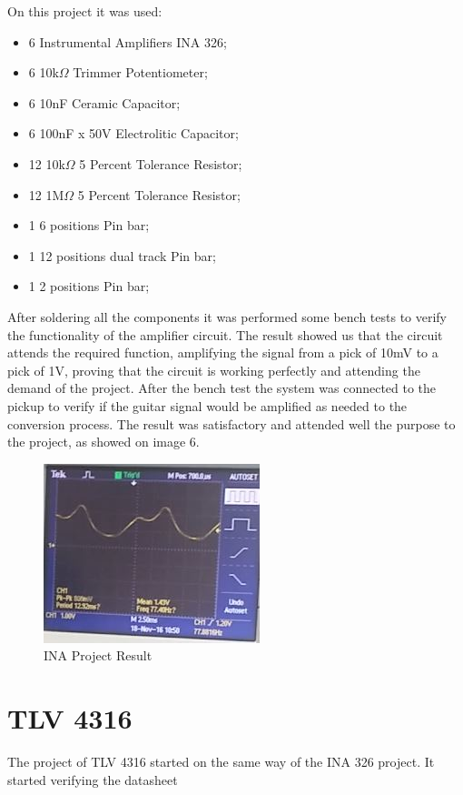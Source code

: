 On this project it was used:

\begin{itemize}
\item 6 Instrumental Amplifiers INA 326;
\item 6 10k$\Omega$ Trimmer Potentiometer;
\item 6 10nF Ceramic Capacitor;
\item 6 100nF x 50V Electrolitic Capacitor;
\item 12 10k$\Omega$ 5 Percent Tolerance Resistor;
\item 12 1M$\Omega$ 5 Percent Tolerance Resistor;
\item 1 6 positions Pin bar;
\item 1 12 positions dual track Pin bar;
\item 1 2 positions Pin bar;
\end{itemize}

After soldering all the components it was performed some bench tests to
verify the functionality of the amplifier circuit. The result showed us that the
circuit attends the required function, amplifying the signal from a pick of 10mV
to a pick of 1V, proving that the circuit is working perfectly and attending the
demand of the project. After the bench test the system was connected to the pickup
to verify if the guitar signal would be amplified as needed to the conversion process.
The result was satisfactory and attended well the purpose to the project, as showed on image 6.

\begin{figure}[!htpb]
\centering
\includegraphics[scale=1]{images/INA_result}
\caption{INA Project Result}
\end{figure}

\section{TLV 4316}
The project of TLV 4316 started on the same way of the INA 326 project.
It started verifying the datasheet
